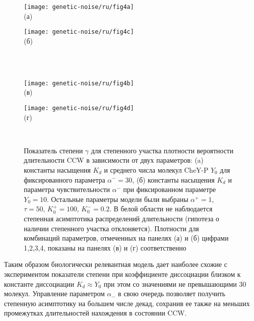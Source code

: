 \begin{figure}[ht]
    \begin{minipage}[b][][b]{0.49\linewidth}\centering
        \texttt{[image: genetic-noise/ru/fig4a]} \\ (а)
    \end{minipage}
    \hfill
    \begin{minipage}[b][][b]{0.49\linewidth}\centering
        \texttt{[image: genetic-noise/ru/fig4c]} \\ (б)
    \end{minipage}\\ \\
    \begin{minipage}[b][][b]{0.49\linewidth}\centering
        \texttt{[image: genetic-noise/ru/fig4b]} \\ (в)
    \end{minipage}
    \hfill
    \begin{minipage}[b][][b]{0.49\linewidth}\centering
        \texttt{[image: genetic-noise/ru/fig4d]} \\ (г)
    \end{minipage} \\
    \caption{
        Показатель степени $\gamma$ для степенного участка плотности вероятности длительности CCW в зависимости от двух параметров: (a) константы насыщения $K_d$ и среднего числа молекул CheY-P $Y_0$ для фиксированного параметра $\alpha^- = 30$, (б) константы насыщения $K_d$ и параметра чувствительности $\alpha^-$ при фиксированном параметре $Y_0 = 10$. Остальные параметры модели были выбраны $\alpha^+=1$, $\tau=50$, $K^+_0=100$, $K^-_0=0.2$. В белой области не наблюдается степенная асимптотика распределений длительности (гипотеза о наличии степенного участка отклоняется). Плотности для комбинаций параметров, отмеченных на панелях (а) и (б) цифрами 1,2,3,4, показаны на панелях (в) и (г) соответственно
    }\label{fig:pdf-gamma-grid-kd}
\end{figure}

Таким образом биологически релевантная модель дает наиболее схожие с экспериментом показатели степени при коэффициенте диссоциации близком к константе диссоциации $K_d \approx Y_0$ при этом со значениями не превышающими $30$ молекул. Управление параметром $\alpha_-$ в свою очередь позволяет получить степенную асимптотику на большем числе декад, сохранив ее также на меньших промежутках длительностей нахождения в состоянии CCW.

